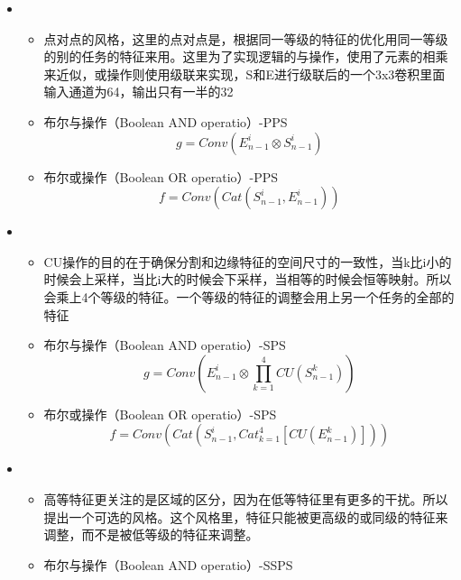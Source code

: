 \begin{itemize}[leftmargin=*]
{\begin{itemize}
		\end{itemize}
	}
	\item {}
	{\small
		\begin{itemize}
			\item 点对点的风格，这里的点对点是，根据同一等级的特征的优化用同一等级的别的任务的特征来用。这里为了实现逻辑的与操作，使用了元素的相乘来近似，或操作则使用级联来实现，S和E进行级联后的一个3x3卷积里面输入通道为64，输出只有一半的32
			\item 布尔与操作（Boolean AND operatio）-PPS
			\begin{equation}g={Conv}\left(E_{n-1}^{i} \otimes S_{n-1}^{i}\right)\end{equation}
			\item 布尔或操作（Boolean OR operatio）-PPS
			\begin{equation}f={Conv}\left({Cat}\left(S_{n-1}^{i}, E_{n-1}^{i}\right)\right)\end{equation}
		\end{itemize}
	}
	\item {}
	{\small
		\begin{itemize}
			\item CU操作的目的在于确保分割和边缘特征的空间尺寸的一致性，当k比i小的时候会上采样，当比i大的时候会下采样，当相等的时候会恒等映射。所以会乘上4个等级的特征。一个等级的特征的调整会用上另一个任务的全部的特征
			\item 布尔与操作（Boolean AND operatio）-SPS
			\begin{equation}g={Conv}\left(E_{n-1}^{i} \otimes \prod_{k=1}^{4} C U\left(S_{n-1}^{k}\right)\right)\end{equation}
			\item 布尔或操作（Boolean OR operatio）-SPS
			\begin{equation}f={Conv}\left({Cat}\left(S_{n-1}^{i}, {Cat}_{k=1}^{4}\left[C U\left(E_{n-1}^{k}\right)\right]\right)\right)\end{equation}
		\end{itemize}
	}
	\item {}
	{\small
		\begin{itemize}
			\item 高等特征更关注的是区域的区分，因为在低等特征里有更多的干扰。所以提出一个可选的风格。这个风格里，特征只能被更高级的或同级的特征来调整，而不是被低等级的特征来调整。
			\item 布尔与操作（Boolean AND operatio）-SSPS

\end{itemize}}
\end{itemize}
